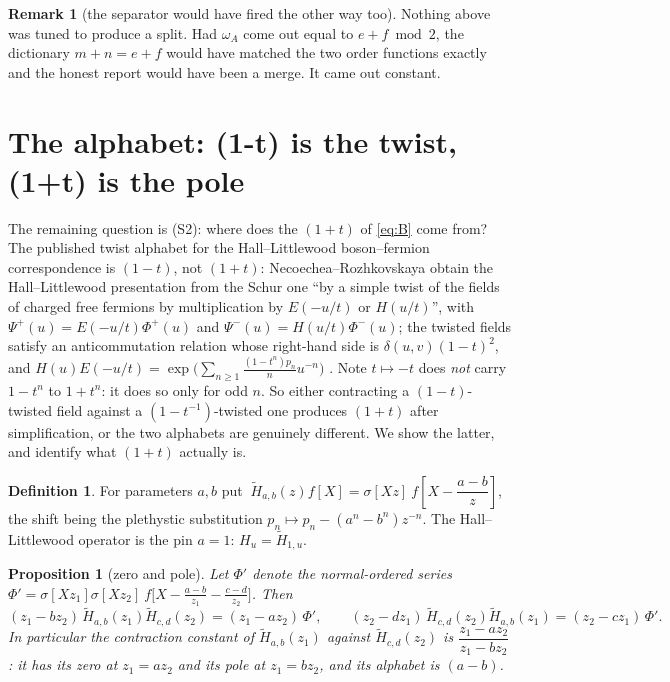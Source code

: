 \documentclass[11pt]{article}
\newtheorem{proposition}[theorem]{Proposition}
\theoremstyle{definition}
\newtheorem{remark}[theorem]{Remark}
\newtheorem{definition}[theorem]{Definition}
\newcommand{\Hop}{H}
\newcommand{\Htil}{\widetilde{H}}
\begin{document}
\begin{remark}[the separator would have fired the other way too]
Nothing above was tuned to produce a split.  Had $\omega_A$ come out equal to
$e+f \bmod 2$, the dictionary $m+n=e+f$ would have matched the two order functions exactly
and the honest report would have been a merge.  It came out constant.
\end{remark}

\section{The alphabet: (1-t) is the twist, (1+t) is the pole}\label{sec:alphabet}

The remaining question is (S2): where does the $(1+t)$ of \eqref{eq:B} come from?  The
published twist alphabet for the Hall--Littlewood boson--fermion correspondence is
$(1-t)$, not $(1+t)$: Necoechea--Rozhkovskaya obtain the Hall--Littlewood presentation from
the Schur one ``by a simple twist of the fields of charged free fermions by multiplication
by $E(-u/t)$ or $H(u/t)$'', with $\Psi^{+}(u)=E(-u/t)\Phi^{+}(u)$ and
$\Psi^{-}(u)=H(u/t)\Phi^{-}(u)$; the twisted fields satisfy an anticommutation relation
whose right-hand side is $\delta(u,v)(1-t)^{2}$, and
$H(u)E(-u/t)=\exp\bigl(\sum_{n\ge1}\tfrac{(1-t^{n})p_n}{n}u^{-n}\bigr)$
\cite[ll.~385, 392--394, 398--405, 735, 764]{NR}.  Note $t\mapsto-t$ does \emph{not} carry
$1-t^{n}$ to $1+t^{n}$: it does so only for odd $n$.  So either contracting a
$(1-t)$-twisted field against a $(1-t^{-1})$-twisted one produces $(1+t)$ after
simplification, or the two alphabets are genuinely different.  We show the latter, and
identify what $(1+t)$ actually is.

\begin{definition}\label{def:htilde}
For parameters $a,b$ put
$\ \Htil_{a,b}(z)f[X]=\sigma[Xz]\ f\!\left[X-\dfrac{a-b}{z}\right]$,
the shift being the plethystic substitution $p_n\mapsto p_n-(a^n-b^n)z^{-n}$.
The Hall--Littlewood operator is the pin $a=1$: $\Hop_u=\Htil_{1,u}$.
\end{definition}

\begin{proposition}[zero and pole]\label{prop:zeropole}
Let $\Phi'$ denote the normal-ordered series
$\Phi'=\sigma[Xz_1]\sigma[Xz_2]\ f\bigl[X-\tfrac{a-b}{z_1}-\tfrac{c-d}{z_2}\bigr]$.  Then
\[
  (z_1-b z_2)\,\Htil_{a,b}(z_1)\Htil_{c,d}(z_2)=(z_1-a z_2)\,\Phi',
  \qquad
  (z_2-d z_1)\,\Htil_{c,d}(z_2)\Htil_{a,b}(z_1)=(z_2-c z_1)\,\Phi' .
\]
In particular the contraction constant of $\Htil_{a,b}(z_1)$ against $\Htil_{c,d}(z_2)$ is
$\dfrac{z_1-az_2}{z_1-bz_2}$: it has its \emph{zero} at $z_1=az_2$ and its \emph{pole} at
$z_1=bz_2$, and its alphabet is $(a-b)$.
\end{proposition}
\end{document}
